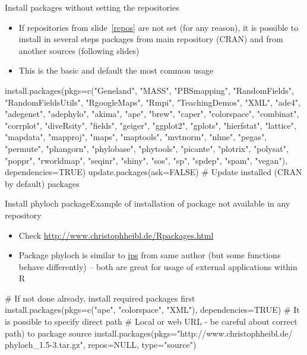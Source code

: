 \documentclass[compress, ucs, xelatex, 11pt, xcolor=svgnames,
  hyperref={
    bookmarks=true,
    unicode=true,
    colorlinks=true,
    pdftitle={Molecular data in R},
    plainpages=false,
    pdfauthor={Vojtech Zeisek},
    pdfsubject={Course about phylogeny and evolution in R},
    pdfcreator={XeLaTeX},
    pdfkeywords={R, evolution, phylogeny, molecular data},
    linkcolor=Tomato,
    anchorcolor=SaddleBrown,
    citecolor=Goldenrod,
    filecolor=DarkMagenta,
    menucolor=Sienna,
    urlcolor=DarkTurquoise,
    pdftex},
  url={hyphens, lowtilde} %
  ]{beamer}
\begin{document}
\begin{frame}[fragile]{Install packages without setting the repositories}
  \begin{itemize}
   \item If repositories from slide~\ref{repos} are not set (for any reason), it is possible to install in several steps packages from main repository (CRAN) and from another sources (following slides)
   \item This is the basic and default the most common usage
  \end{itemize}
  \begin{spluscode}
    install.packages(pkgs=c("Geneland", "MASS", "PBSmapping",
      "RandomFields", "RandomFieldsUtils", "RgoogleMaps", "Rmpi",
      "TeachingDemos", "XML", "ade4", "adegenet", "adephylo", "akima",
      "ape", "brew", "caper", "colorspace", "combinat", "corrplot",
      "diveRsity", "fields", "geiger", "ggplot2", "gplots", "hierfstat",
      "lattice", "mapdata", "mapproj", "maps", "maptools", "mvtnorm",
      "nlme", "pegas", "permute", "phangorn", "phylobase", "phytools",
      "picante", "plotrix", "polysat", "poppr", "rworldmap", "seqinr",
      "shiny", "sos", "sp", "spdep", "spam", "vegan"), dependencies=TRUE)
    update.packages(ask=FALSE) # Update installed (CRAN by default) packages
  \end{spluscode}
\end{frame}

\begin{frame}[fragile]{Install phyloch package}{Example of installation of package not available in any repository}
  \begin{itemize}
    \item Check \url{http://www.christophheibl.de/Rpackages.html} 
    \item Package phyloch is similar to \href{https://cran.r-project.org/web/packages/ips/}{ips} from same author (but some functions behave differently) -- both are great for usage of external applications within R
  \end{itemize}
  \begin{spluscode}
    # If not done already, install required packages first
    install.packages(pkgs=c("ape", "colorspace", "XML"),
      dependencies=TRUE)
    # It is possible to specify direct path
    # Local or web URL - be careful about correct path) to package source
    install.packages(pkgs="http://www.christophheibl.de/
      phyloch_1.5-3.tar.gz", repos=NULL, type="source")
  \end{spluscode}
\end{frame}
\end{document}

